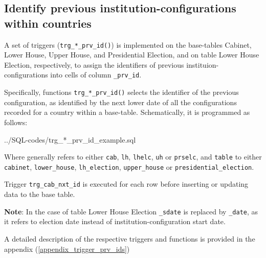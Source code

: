 \subsection{Identify previous institution-configurations within countries}\label{trg_prv_ids}
A set of triggers (\texttt{\footnotesize trg\_*\_prv\_id()}) is implemented on the base-tables Cabinet, Lower House, Upper House, and Presidential Election, and on table Lower House Election, respectively, to assign the identifiers of previous instituion-configurations into cells of column \texttt{\footnotesize *\_prv\_id}.

Specifically, functions \texttt{\footnotesize trg\_*\_prv\_id()} selects the identifier of the previous  configuration, as identified by the next lower date of all the configurations recorded for a country within a base-table.
Schematically, it is programmed as follows:

%
{../SQL-codes/trg_*_prv_id_example.sql}

Where generally \texttt{\footnotesize *} refers to either \texttt{\footnotesize cab}, \texttt{\footnotesize lh}, \texttt{\footnotesize lhelc}, \texttt{\footnotesize uh} or \texttt{\footnotesize prselc}, and \texttt{\footnotesize *table} to either \texttt{\footnotesize cabinet}, \texttt{\footnotesize lower\_house}, \texttt{\footnotesize lh\_election}, \texttt{\footnotesize upper\_house} or \texttt{\footnotesize presidential\_election}.

Trigger \texttt{\footnotesize trg\_cab\_nxt\_id} is executed for each row before inserting or updating data to the base table.

{\bf Note}: In the case of table Lower House Election \texttt{\footnotesize \_sdate} is replaced by \texttt{\footnotesize \_date}, as it refers to election date instead of institution-configuration start date.

A detailed description of the respective triggers and functions is provided in the appendix (\ref{appendix_trigger_prv_ids})



